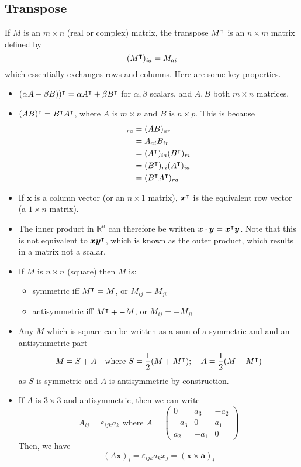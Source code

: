\documentclass{article}
\begin{document}
	\subsection{Transpose}
	If $M$ is an $m \times n$ (real or complex) matrix, the transpose $M^\intercal$ is an $n \times m$ matrix defined by
	\[ (M^\intercal)_{ia} = M_{ai} \]
	which essentially exchanges rows and columns. Here are some key properties.
	\begin{itemize}
		\item $(\alpha A + \beta B))^\intercal = \alpha A^\intercal + \beta B^\intercal$ for $\alpha, \beta$ scalars, and $A, B$ both $m \times n$ matrices.
		\item $(AB)^\intercal = B^\intercal A^\intercal$, where $A$ is $m \times n$ and $B$ is $n \times p$. This is because
		\begin{align*}
			[(AB)^\transpose]_{ra} &= (AB)_{ar} \\
			&= A_{ai} B_{ir} \\
			&= (A^\transpose)_{ia} (B^\transpose)_{ri} \\
			&= (B^\transpose)_{ri} (A^\transpose)_{ia} \\
			&= (B^\transpose A^\transpose)_{ra}
		\end{align*}
		\item If $\bm x$ is a column vector (or an $n \times 1$ matrix), $\bm x^\intercal$ is the equivalent row vector (a $1 \times n$ matrix).
		\item The inner product in $\mathbb R^n$ can therefore be written $\bm x \cdot \bm y = \bm x^\intercal \bm y$. Note that this is not equivalent to $\bm x \bm y^\intercal$, which is known as the outer product, which results in a matrix not a scalar.
		\item If $M$ is $n \times n$ (square) then $M$ is:
		\begin{itemize}
			\item symmetric iff $M^\intercal = M$, or $M_{ij} = M_{ji}$
			\item antisymmetric iff $M^\intercal + -M$, or $M_{ij} = -M_{ji}$
		\end{itemize}
		\item Any $M$ which is square can be written as a sum of a symmetric and and an antisymmetric part
		\[ M = S + A\quad\text{where } S = \frac{1}{2}(M + M^\intercal);\quad A = \frac{1}{2}(M - M^\intercal) \]
		as $S$ is symmetric and $A$ is antisymmetric by construction.
		\item If $A$ is $3 \times 3$ and antisymmetric, then we can write
		\[ A_{ij} = \varepsilon_{ijk}a_k\text{ where } A = \begin{pmatrix}
			0 & a_3 & -a_2 \\
			-a_3 & 0 & a_1 \\
			a_2 & -a_1 & 0
		\end{pmatrix} \]
		Then, we have
		\[
			(A \bm x)_i = \varepsilon_{ijk}a_k x_j = (\bm x \times \bm a)_i
		\]
	\end{itemize}
\end{document}
